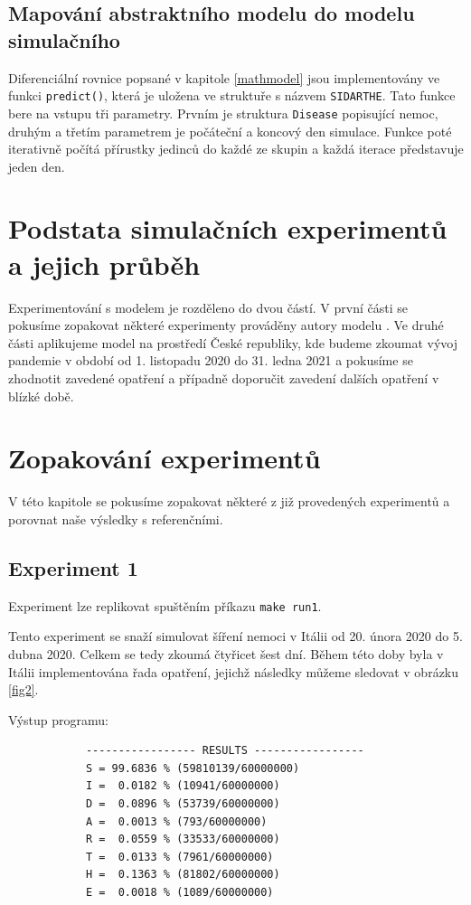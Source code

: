 \documentclass[a4paper,11pt]{article}
\begin{document}
		\subsection{Mapování abstraktního modelu do modelu simulačního}
			Diferenciální rovnice popsané v kapitole \ref{mathmodel} jsou implementovány ve funkci \texttt{predict()}, která je uložena ve struktuře s názvem \texttt{SIDARTHE}. Tato funkce bere na vstupu tři parametry. Prvním je struktura \texttt{Disease} popisující nemoc, druhým a třetím parametrem je počáteční a koncový den simulace. Funkce poté iterativně počítá přírustky jedinců do každé ze skupin a každá iterace představuje jeden den.
			
	\section{Podstata simulačních experimentů a jejich průběh}
	\label{experiments}
		Experimentování s modelem je rozděleno do dvou částí. V první části se pokusíme zopakovat některé experimenty prováděny autory modelu \cite{source}. Ve druhé části aplikujeme model na prostředí České republiky, kde budeme zkoumat vývoj pandemie v období od 1. listopadu 2020 do 31. ledna 2021 a pokusíme se zhodnotit zavedené opatření a případně doporučit zavedení dalších opatření v blízké době.
		
	\section{Zopakování experimentů}
		V této kapitole se pokusíme zopakovat některé z již provedených experimentů a porovnat naše výsledky s referenčními.
	
		\subsection{Experiment 1}
		\label{e1}
			Experiment lze replikovat spuštěním příkazu \texttt{make run1}.
		
			Tento experiment se snaží simulovat šíření nemoci v Itálii od 20. února 2020 do 5. dubna 2020. Celkem se tedy zkoumá čtyřicet šest dní. Během této doby byla v Itálii implementována řada opatření, jejichž následky můžeme sledovat v obrázku \ref{fig2}.
			
			Výstup programu:
			\begin{verbatim}
			----------------- RESULTS -----------------
			S = 99.6836 % (59810139/60000000)
			I =  0.0182 % (10941/60000000)
			D =  0.0896 % (53739/60000000)
			A =  0.0013 % (793/60000000)
			R =  0.0559 % (33533/60000000)
			T =  0.0133 % (7961/60000000)
			H =  0.1363 % (81802/60000000)
			E =  0.0018 % (1089/60000000)
			\end{verbatim}
			
\end{document}
